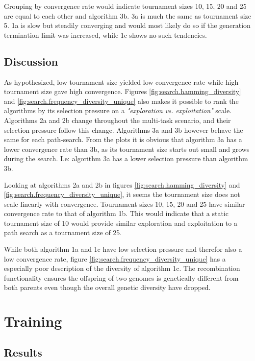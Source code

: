 Grouping by convergence rate would indicate tournament sizes 10, 15, 20 and 25 are equal to each other and algorithm 3b. 3a is much the same as tournament size 5. 1a is slow but steadily converging and would most likely do so if the generation termination limit was increased, while 1c shows no such tendencies. 

\subsection{Discussion}
As hypothesized, low tournament size yielded low convergence rate while high tournament size gave high convergence. Figures \ref{fig:search.hamming_diversity} and \ref{fig:search.frequency_diversity_unique} also makes it possible to rank the algorithms by its selection pressure on a \textit{"exploration vs. exploitation"} scale. Algorithms 2a and 2b change throughout the multi-task scenario, and their selection pressure follow this change. Algorithms 3a and 3b however behave the same for each path-search. From the plots it is obvious that algorithm 3a has a lower convergence rate than 3b, as its tournament size starts out small and grows during the search. I.e: algorithm 3a has a lower selection pressure than algorithm 3b. 

Looking at algorithms 2a and 2b in figures \ref{fig:search.hamming_diversity} and \ref{fig:search.frequency_diversity_unique}, it seems the tournament size does not scale linearly with convergence. Tournament sizes 10, 15, 20 and 25 have similar convergence rate to that of algorithm 1b. This would indicate that a static tournament size of 10 would provide similar exploration and exploitation to a path search as a tournament size of 25. 

While both algorithm 1a and 1c have low selection pressure and therefor also a low convergence rate, figure \ref{fig:search.frequency_diversity_unique} has a especially poor description of the diversity of algorithm 1c. The recombination functionality ensures the offspring of two genomes is genetically different from both parents even though the overall genetic diversity have dropped.

\section{Training}

\subsection{Results}

